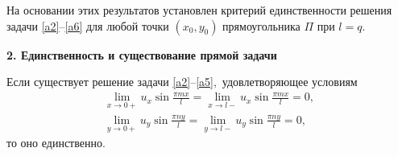 На основании этих результатов установлен критерий единственности решения задачи \eqref{a2}--\eqref{a6} для любой точки $(x_0,y_0)$ прямоугольника $\Pi$ при $l=q$.

\smallskip

{\bf 2. Единственность и существование прямой задачи}

\begin{theorem}[1] Если существует решение задачи \eqref{a2}--\eqref{a5}$,$ удовлетворяющее условиям
\begin{gather}
\label{b7}
\lim_{x\rightarrow0+}u_x\sin\frac{\pi mx}{l}=\lim_{x\rightarrow l-}u_x\sin\frac{\pi mx}{l}=0,
\\
\label{b8}
\lim_{y\rightarrow0+}u_y\sin\frac{\pi ny}{l}=\lim_{y\rightarrow l-}u_y\sin\frac{\pi ny}{l}=0,
\end{gather}
то оно единственно$.$ \end{theorem}

\smallskip

